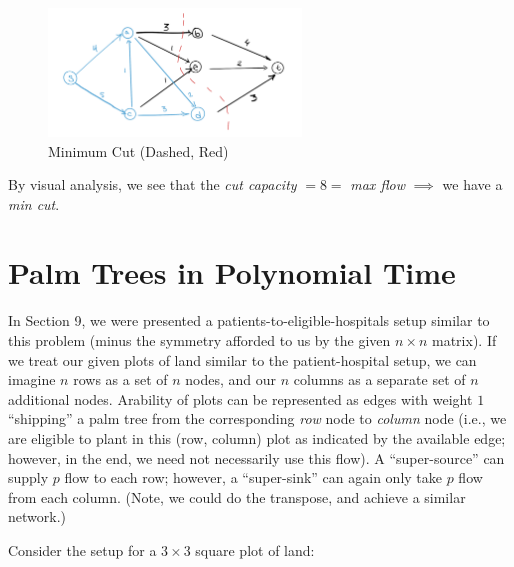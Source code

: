 \documentclass[conference]{styles/acmsiggraph}
\newcommand{\?}{\stackrel{?}{=}}
\begin{document}
\begin{figure}[h!]
    \centering
    \includegraphics[width=0.6\textwidth]{P2 Figs/2.FINAL.PNG}
    \caption{Minimum Cut (Dashed, Red)}
    \label{fig:2.6}
\end{figure}
\FloatBarrier

By visual analysis, we see that the \textit{cut capacity} $= 8 = $ \textit{max flow} $\implies$ we have a \textit{min cut}.







\newpage


\section{Palm Trees in Polynomial Time}
In Section 9, we were presented a patients-to-eligible-hospitals setup similar to this problem (minus the symmetry afforded to us by the given $n \times n$ matrix).  If we treat our given plots of land similar to the patient-hospital setup, we can imagine $n$ rows as a set of $n$ nodes, and our $n$ columns as a separate set of $n$ additional nodes.  Arability of plots can be represented as edges with weight $1$ \enquote{shipping} a palm tree from the corresponding \textit{row} node to \textit{column} node (i.e., we are eligible to plant in this (row, column) plot as indicated by the available edge; however, in the end, we need not necessarily use this flow).  A \enquote{super-source} can supply $p$ flow to each row; however, a \enquote{super-sink} can again only take $p$ flow from each column.  (Note, we could do the transpose, and achieve a similar network.)

Consider the setup for a $3 \times 3$ square plot of land:

\begin{table}[htbp]
    \centering
    \caption{Subplots (1 $\implies$ arable)}
    \label{tab:land}%
\end{table}
\FloatBarrier
\end{document}
